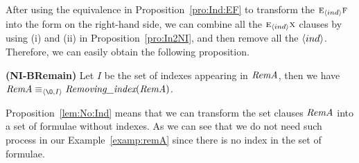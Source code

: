 \documentclass[letterpaper]{article}
\begin{document}




After using the equivalence in Proposition~\ref{pro:Ind:EF} to transform the $\textsc{e}_{{\langle{ind}\rangle}} \textsc{f}$ into the form on the right-hand side, we can combine all the $\textsc{e}_{{\langle{ind}\rangle}} \textsc{x}$ clauses by using (i) and (ii) in Proposition~\ref{pro:In2NI}, 
and then remove all the ${\langle{ind}\rangle}$.
Therefore, we can easily obtain the following proposition.

\begin{proposition}\label{lem:No:Ind}
\textbf{(NI-BRemain)}
Let $I$ be the set of indexes appearing in $\emph{RemA}$, then
we have $\emph{RemA}\equiv_{\tuple{{\O}, I}} \emph{Removing\_index}(\emph{RemA})$.
\end{proposition}
Proposition~\ref{lem:No:Ind} means that we can transform the set clauses $\emph{RemA}$ into a set of formulae without indexes.
As we can see that we do not need such  process in our Example~\ref{examp:remA} since there is no index in the set of formulae.
\end{document}
